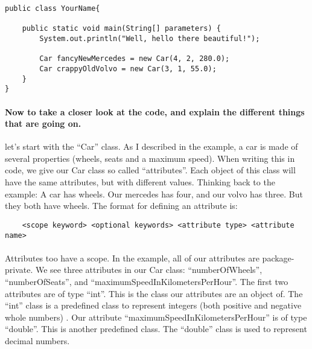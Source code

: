 \documentclass[11pt,fleqn]{book} %
\begin{document}
\begin{lstlisting}[caption=YourName.java]
	public class YourName{

	public static void main(String[] parameters) {
		System.out.println("Well, hello there beautiful!");
		
		Car fancyNewMercedes = new Car(4, 2, 280.0);
		Car crappyOldVolvo = new Car(3, 1, 55.0);
	}	
}
\end{lstlisting}

\paragraph{Now to take a closer look at the code, and explain the different things that are going on.} let's start with the ``Car'' class. As I described in the example, a car is made of several properties (wheels, seats and a maximum speed). When writing this in code, we give our Car class so called ``attributes''. Each object of this class will have the same attributes, but with different values. Thinking back to the example: A car has wheels. Our mercedes has four, and our volvo has three.   But they both have wheels. The format for defining an attribute is:
\begin{verbatim}
	<scope keyword> <optional keywords> <attribute type> <attribute name>
\end{verbatim}

 \paragraph{} Attributes too have a scope. In the example, all of our attributes are package-private. 
 We see three attributes in our Car class: ``numberOfWheels'', ``numberOfSeats'', and ``maximumSpeedInKilometersPerHour''. The first two attributes are of type ``int''. This is the class our attributes are an object of. The ``int'' class is a predefined class to represent integers (both positive and negative whole numbers) . Our attribute ``maximumSpeedInKilometersPerHour'' is of type ``double''. This is another predefined class. The ``double'' class is used to represent decimal numbers.
 
\end{document}

